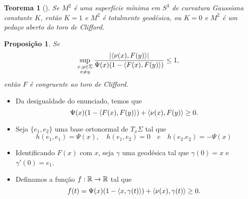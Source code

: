 \documentclass[12pt,a4paper]{beamer}
\newtheorem{teorema}{Teorema}
\newtheorem{proposicao}{Proposição}
\theoremstyle{definition}
\begin{document}
\begin{frame}
	
	
	\begin{teorema}[\cite{Lawson1969}]
		\label{curv-gauss-de-sup-min-em-S3}
		Se $M^2$ é uma superfície mínima em $S^3$ de curvatura Gaussiana constante $K$, então $K=1$ e $M^2$ é totalmente geodésica, ou $K=0$ e $M^2$ é um pedaço aberto do toro de Clifford.
	\end{teorema}	
	
\end{frame}

\begin{frame}
	\begin{proposicao}\label{aleph-leq-1}
		Se
		\begin{equation*}
			\sup_{\substack{x,y \in \Sigma \\ x \neq y}} \frac{\left| \left\langle \nu(x),F(y) \right\rangle \right|}{\Psi(x) (1-\left\langle F(x),F(y) \right\rangle)} \leq 1,
		\end{equation*}
		então $F$ é congruente ao toro de Clifford.
	\end{proposicao}
\end{frame}

\begin{frame}
	\begin{itemize}
		\item Da desigualdade do enunciado, temos que
		\begin{equation*}
		\Psi(x) (1-\left\langle F(x),F(y) \right\rangle) + \left\langle \nu(x),F(y) \right\rangle \geq 0.
		\end{equation*}
		
		\item Seja $\{ e_1,e_2 \}$ uma base ortonormal de $T_x \Sigma$ tal que
		\begin{equation*}
		h(e_1,e_1)=\Psi(x), \quad h(e_1,e_2)=0 \quad e \quad h(e_2.e_2)=-\Psi(x)
		\end{equation*}
		
		\item Identificando $F(x)$ com $x$, seja $\gamma$ uma geodésica tal que $\gamma(0)=x$ e $\gamma'(0)=e_1$.
		
		\item Definamos a função $f: \mathbb R \rightarrow \mathbb R$ tal que
		\begin{equation*}
		f(t) = \Psi(x) (1-\left\langle x,\gamma(t) \right\rangle) + \left\langle \nu(x),\gamma(t) \right\rangle \geq 0.
		\end{equation*}
	\end{itemize}
\end{frame}
\end{document}
